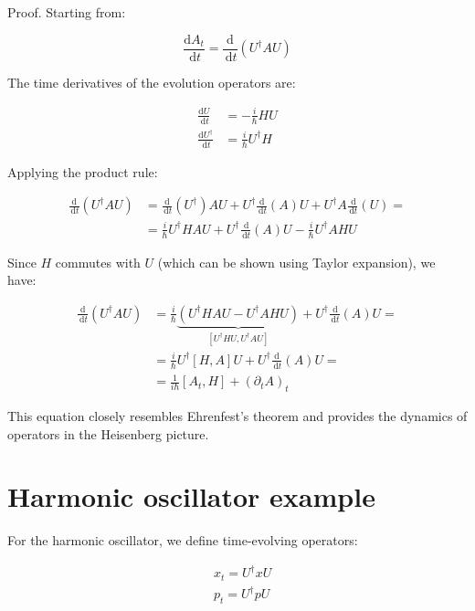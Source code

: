 Proof. Starting from:

\begin{equation}
\frac{\mathrm{d} A_{t}}{\, \mathrm{d} t}=\frac{\mathrm{d}}{\, \mathrm{d} t}\left(U^{\dagger} A U\right)
\end{equation}

The time derivatives of the evolution operators are:

\begin{align}
\frac{\mathrm{d} U}{\, \mathrm{d} t} & =-\frac{i}{\hbar} H U \\
\frac{\mathrm{d} U^{\dagger}}{\, \mathrm{d} t} & =\frac{i}{\hbar} U^{\dagger} H
\end{align}

Applying the product rule:

\begin{align}
\frac{\mathrm{d}}{\, \mathrm{d} t}\left(U^{\dagger} A U\right) & =\frac{\mathrm{d}}{\, \mathrm{d} t}\left(U^{\dagger}\right) A U+U^{\dagger} \frac{\mathrm{d}}{\, \mathrm{d} t}(A) U+U^{\dagger} A \frac{\, \mathrm{d}}{\, \mathrm{d} t}(U)=  \\
& =\frac{i}{\hbar} U^{\dagger} H A U+U^{\dagger} \frac{\, \mathrm{d}}{\, \mathrm{d} t}(A) U-\frac{i}{\hbar} U^{\dagger} A H U
\end{align}

Since $H$ commutes with $U$ (which can be shown using Taylor expansion), we have:

\begin{align}
\frac{\mathrm{d}}{\, \mathrm{d} t}\left(U^{\dagger} A U\right) & =\frac{i}{\hbar} \underbrace{\left(U^{\dagger} H A U-U^{\dagger} A H U\right)}_{\left[U^{\dagger}HU, U^{\dagger}AU\right]}+U^{\dagger} \frac{\, \mathrm{d}}{\, \mathrm{d} t}(A) U= \\
& =\frac{i}{\hbar} U^{\dagger}[H,A]U + U^{\dagger} \frac{\mathrm{d}}{\, \mathrm{d} t}(A) U= \\
& =\frac{1}{i \hbar}\left[A_{t}, H\right]+\left(\partial_{t} A\right)_{t}
\end{align}

This equation closely resembles Ehrenfest's theorem and provides the dynamics of operators in the Heisenberg picture.

\section{Harmonic oscillator example}
For the harmonic oscillator, we define time-evolving operators:

\begin{align}
& x_{t}=U^{\dagger} x U \\
& p_{t}=U^{\dagger} p U
\end{align}

